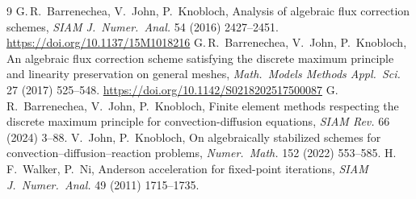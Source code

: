 \documentclass[11pt]{article}
\begin{document}
\begin{thebibliography}{9}
 G.\,R.~Barrenechea, V.~John, P.~Knobloch, Analysis of algebraic flux correction schemes,
  \emph{SIAM J.\ Numer.\ Anal.} 54 (2016) 2427--2451. \url{https://doi.org/10.1137/15M1018216}
 G.\,R.~Barrenechea, V.~John, P.~Knobloch, An algebraic flux correction scheme satisfying the discrete
  maximum principle and linearity preservation on general meshes, \emph{Math.\ Models Methods Appl.\ Sci.} 27 (2017)
  525--548. \url{https://doi.org/10.1142/S0218202517500087}
 G.\,R.~Barrenechea, V.~John, P.~Knobloch, Finite element methods respecting the discrete maximum
  principle for convection-diffusion equations, \emph{SIAM Rev.} 66 (2024) 3--88.
 V.~John, P.~Knobloch, On algebraically stabilized schemes for convection--diffusion--reaction problems,
  \emph{Numer.\ Math.} 152 (2022) 553--585.
 H.\,F.~Walker, P.~Ni, Anderson acceleration for fixed-point iterations, \emph{SIAM J.\ Numer.\ Anal.}
  49 (2011) 1715--1735.
\end{thebibliography}
\end{document}
